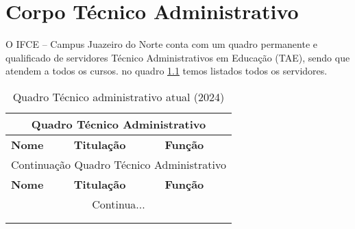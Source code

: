\begin{quadro}[!h]
{\begin{tabular}{|p{4cm}|p{2cm}|p{2cm}|p{3cm}|}
\end{tabular}
}{
}
\end{quadro}

\chapter{Corpo Técnico Administrativo}

O IFCE – Campus Juazeiro do Norte conta com um quadro permanente e qualificado de servidores Técnico Administrativos em Educação (TAE), sendo que atendem a todos os cursos. no quadro \ref{qua:taes} temos listados todos os servidores.\\

	

\begin{longtable}{|p{6cm}|p{3cm}|p{4cm}|}
\caption{Quadro Técnico administrativo atual (2024)\label{qua:taes}}\\
\hline
\multicolumn{3}{|c|}{ Quadro Técnico Administrativo} \\
\hline
\textbf{Nome} & \textbf{Titulação} & \textbf{Função}\\
\hline
\endfirsthead
\multicolumn{3}{|c|}{Continuação Quadro Técnico Administrativo} \\
\hline
\textbf{Nome} & \textbf{Titulação} & \textbf{Função}\\
\hline
\endhead

\hline
\multicolumn{3}{|c|}{  Continua...}\\
\hline
\endfoot

\multicolumn{3}{|c|}{  Fim do Quadro Técnico Administrativo} \\
\hline
\endlastfoot


\end{longtable}
